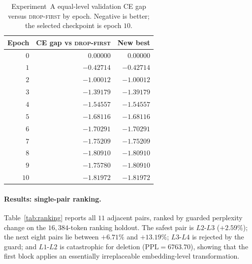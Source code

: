 \documentclass[10pt,a4paper]{article}
\newcommand{\dropfirst}{\textsc{drop-first}}
\begin{document}
\begin{table}[t]
\centering
\small
\begin{tabular}{rrr}
\toprule
Epoch & CE gap vs \dropfirst{} & New best \\
\midrule
$0$  & $0.00000$ & $0.00000$ \\
$1$  & $-0.42714$ & $-0.42714$ \\
$2$  & $-1.00012$ & $-1.00012$ \\
$3$  & $-1.39179$ & $-1.39179$ \\
$4$  & $-1.54557$ & $-1.54557$ \\
$5$  & $-1.68116$ & $-1.68116$ \\
$6$  & $-1.70291$ & $-1.70291$ \\
$7$  & $-1.75209$ & $-1.75209$ \\
$8$  & $-1.80910$ & $-1.80910$ \\
$9$  & $-1.75780$ & $-1.80910$ \\
$10$ & $-1.81972$ & $-1.81972$ \\
\bottomrule
\end{tabular}
\caption{Experiment~A equal-level validation CE gap versus \dropfirst{} by
epoch. Negative is better; the selected checkpoint is epoch $10$.}
\label{tab:gap}
\end{table}

\paragraph{Results: single-pair ranking.} Table~\ref{tab:ranking} reports all
$11$ adjacent pairs, ranked by guarded perplexity change on the $16{,}384$-token
ranking holdout. The safest pair is $L2\text{-}L3$ ($+2.59\%$); the next eight
pairs lie between $+6.71\%$ and $+13.19\%$; $L3\text{-}L4$ is rejected by the
guard; and $L1\text{-}L2$ is catastrophic for deletion ($\mathrm{PPL}=6763.70$),
showing that the first block applies an essentially irreplaceable
embedding-level transformation.
\end{document}
